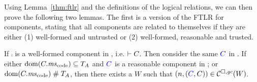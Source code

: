 %
Using Lemma~\ref{thm:ftlr} and the definitions of the logical relations, we can then prove the following two lemmas.
The first is a version of the FTLR for components, stating that all components are related to themselves if they are either (1) well-formed and untrusted or (2) well-formed, reasonable and trusted.
\begin{lemma}
  \label{lem:ftlr-comps}
  If $\comp$ is a well-formed component in \trgcm{}, i.e. $ \vdash C$.
  Then consider the same ${\color{blue} C}$ in \srccm{}.
  If either $\dom(\comp.\mscode) \subseteq \ta$ and ${\color{blue} C}$ is a reasonable component in \srccm{}; or $\dom(\comp.\mscode) \mathrel{\#} \ta$, then there exists a $W$ such that
  $\left(n,({\color{blue} C},C)\right) \in \mathcal{C}^{\square,\mathit{gc}}(W)$.
\end{lemma}

